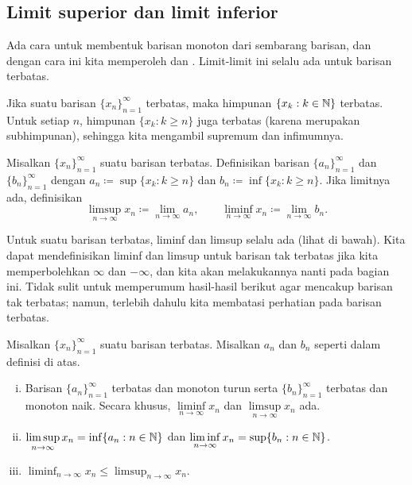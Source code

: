 \subsection{Limit superior dan limit inferior}

Ada cara untuk membentuk barisan monoton dari sembarang barisan, dan
dengan cara ini kita
memperoleh \emph{} dan
\emph{}.  Limit-limit ini selalu ada untuk barisan
terbatas.

Jika suatu barisan $\{ x_n \}_{n=1}^\infty$ terbatas, maka 
himpunan $\{ x_k : k \in {\mathbb{N}} \}$ terbatas.  Untuk setiap $n$,
himpunan $\{ x_k : k \geq n \}$ juga terbatas (karena merupakan subhimpunan), sehingga kita
mengambil supremum dan infimumnya.

\begin{defn} \label{liminflimsup:def}
Misalkan $\{ x_n \}_{n=1}^\infty$ suatu barisan terbatas.  Definisikan barisan
$\{ a_n \}_{n=1}^\infty$
dan $\{ b_n \}_{n=1}^\infty$ dengan
$a_n \coloneqq \sup \{ x_k : k \geq n \}$ dan
$b_n \coloneqq \inf \{ x_k : k \geq n \}$.  
Jika limitnya ada, definisikan
\begin{equation*}
\limsup_{n \to \infty} x_n \coloneqq \lim_{n \to \infty} a_n ,
\qquad
\liminf_{n \to \infty} x_n \coloneqq \lim_{n \to \infty} b_n .
\end{equation*}
\end{defn}

Untuk suatu barisan terbatas, liminf dan limsup selalu ada (lihat di bawah).  Kita dapat
mendefinisikan liminf dan limsup untuk barisan tak terbatas jika kita memperbolehkan $\infty$
dan $-\infty$, dan kita akan melakukannya nanti pada bagian ini.
Tidak sulit untuk memperumum hasil-hasil berikut agar
mencakup barisan tak terbatas; namun, terlebih dahulu kita membatasi perhatian pada
barisan terbatas.

\begin{prop}
Misalkan $\{ x_n \}_{n=1}^\infty$ suatu barisan terbatas.  Misalkan $a_n$ dan $b_n$ seperti dalam
definisi di atas.
\begin{enumerate}[(i)]
\item
Barisan
$\{ a_n \}_{n=1}^\infty$ terbatas dan monoton turun
serta $\{ b_n \}_{n=1}^\infty$ terbatas dan monoton naik.  Secara khusus,
$\liminf\limits_{n\to\infty} x_n$ dan $\limsup\limits_{n\to\infty} x_n$ ada.
\item
$\displaystyle \limsup_{n \to \infty} x_n = \inf \{ a_n : n \in {\mathbb{N}} \}$
dan
$\displaystyle \liminf_{n \to \infty} x_n = \sup \{ b_n : n \in {\mathbb{N}} \}$.
\item
$\displaystyle \liminf_{n \to \infty} x_n \leq \limsup_{n \to \infty} x_n$.
\end{enumerate}
\end{prop}

